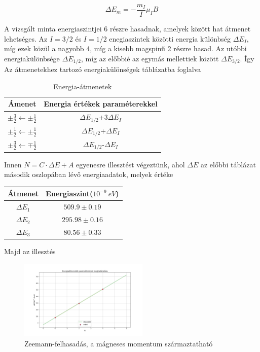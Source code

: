\documentclass[a4paper,12pt]{article}
\begin{document}
\begin{equation*}
	\Delta E_{m} = -\frac{m_{I}}{I}\mu_{I}B
\end{equation*}

\par A vizsgált minta energiaszintjei 6 részre hasadnak, amelyek között hat átmenet lehetséges. Az $I = 3/2$ és $I = 1/2$ enegiaszintek közötti energia különbség $\Delta E_{I}$, míg ezek közül a nagyobb 4, míg a kisebb magspinű 2 részre hasad. Az utóbbi energiakülönbsége $\Delta E_{1/2}$, míg az előbbié az egymás mellettiek között $\Delta E_{3/2}$. Így Az átmenetekhez tartozó energiakülönségek táblázatba foglalva

\begin{table}[h!]
\centering
\begin{tabular}{|c| c|} \hline
Ámenet& Energia értékek paraméterekkel \\ \hline
$\pm \frac{3}{2}\leftarrow\pm\frac{1}{2}$& $\Delta E_{1/2}$+3$\Delta E_{I}$\\ \hline
$\pm \frac{1}{2}\leftarrow\pm\frac{1}{2}$& $\Delta E_{1/2}$+$\Delta E_{I}$\\ \hline
$\pm \frac{3}{2}\leftarrow\mp\frac{1}{2}$& $\Delta E_{1/2}$-$\Delta E_{I}$\\ \hline
\end{tabular}
\caption{Energia-átmenetek}
\end{table}

\par Innen $ N = C\cdot \Delta E + A$ egyenesre illesztést végeztünk, ahol $\Delta E$ az előbbi táblázat második oszlopában lévő energiaadatok, melyek értéke

\begin{table}[h!]
\centering
\begin{tabular}{|c |c|} \hline
Átmenet & Energiaszint($10^{-9}~eV$)\\ \hline
$\Delta E_1$ & $509.9\pm0.19$\\ \hline
$\Delta E_2$ &  $295.98\pm0.16$\\ \hline
$\Delta E_3$ & $80.56\pm0.33$\\ \hline
\end{tabular}
\end{table}

\par Majd az illesztés

\begin{figure}[h!]
\centering
\includegraphics[width=0.55\textwidth]{parameterek.png}
\caption{Zeemann-felhasadás, a mágneses momentum származtatható}
\end{figure}
\end{document}
